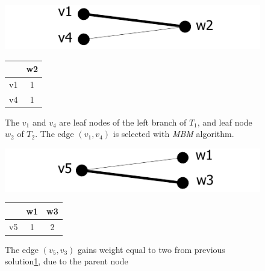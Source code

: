 \documentclass{report}
\begin{document}
\begin{figure}[h]
  \begin{minipage}[h]{0.60\linewidth}
    \centering
    \includegraphics[scale=0.95]{Figures/algorithms/TD/3ex.pdf}\\[0.1cm]
  \end{minipage}%
  \begin{minipage}[h]{0.30\linewidth}
    \centering
\begin{tabular}{|c|c|}
\hline
   & w2 \\ \hline
v1 &  \cellcolor[gray]{0.9}1  \\ \hline
v4 & 1  \\ \hline
\end{tabular}
\end{minipage}
\caption{The $v_{1}$ and $v_{4}$ are leaf nodes of the left branch of $ T_{1}$, and leaf node $w_{2}$ of $ T_{2}$. The edge $(v_{1},v_{4})$ is selected with \emph{MBM} algorithm. }
\label{fig:ex3}
\end{figure}

\begin{figure}
  \begin{minipage}[h]{0.60\linewidth}
    \centering
    \includegraphics[scale=0.95]{Figures/algorithms/TD/2ex.pdf}\\[0.1cm]
  \end{minipage}%
  \begin{minipage}[b]{0.30\linewidth}
    \centering
	\caption{}
\begin{tabular}{|c|c|c|}
\hline
   & w1 & w3                        \\ \hline
v5 & 1  & \cellcolor[gray]{0.9} 2 \\ \hline
\end{tabular}
\end{minipage}
\caption{The edge $(v_{5},v_{3})$ gains weight equal to two from previous solution\ref{fig:ex3}, due to the parent node}
\label{fig:ex2}
\end{figure}
\end{document}

